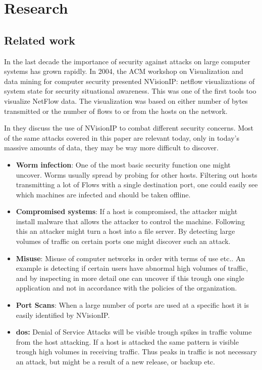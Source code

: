 \chapter{Research}
\label{chp:research} 

\section{Related work}
In the last decade the importance of security against attacks on large computer systems has grown rapidly. In 2004, the ACM workshop on Visualization and data mining for computer security presented NVisionIP: netflow visualizations of system state for security situational awareness\cite{nvisionip}. This was one of the first tools too visualize NetFlow data. The visualization was based on either number of bytes transmitted or the number of flows to or from the hosts on the network. 

In \cite{nvisionip_list} they discuss the use of NVisionIP to combat different security concerns. Most of the same attacks covered in this paper are relevant today, only in today's massive amounts of data, they may be way more difficult to discover. 

\begin{itemize}
\item \textbf{Worm infection}: One of the most basic security function one might uncover.  Worms usually spread by probing for other hosts. Filtering out hosts transmitting a lot of Flows with a single destination port, one could easily see which machines are infected and should be taken offline. 
\item \textbf{Compromised systems}: If a host is compromised, the attacker might install malware that allows the attacker to control the machine. Following this an attacker might turn a host into a file server. By detecting large volumes of traffic on certain ports one might discover such an attack. 
\item \textbf{Misuse}: Misuse of computer networks in order with terms of use etc.. An example is detecting if certain users have abnormal high volumes of traffic, and by inspecting in more detail one can uncover if this trough one single application and not in accordance with the policies of the organization. 
\item \textbf{Port Scans}: When a large number of ports are used at a specific host it is easily identified by NVisionIP.
\item \label{patterns}\textbf{\gls{dos}:} Denial of Service Attacks will be visible trough spikes in traffic volume from the host attacking. If a host is attacked the same pattern is visible trough high volumes in receiving traffic. Thus peaks in traffic is not necessary an attack, but might be a result of a new release, or backup etc.
\end{itemize}


